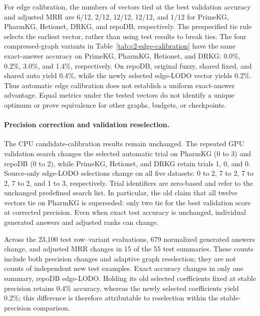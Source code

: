 \begin{table}[t]
\centering
\caption{Test adjusted MRR@20 in the graph-selection arm. Candidate order and
the compressed-graph budget are fixed per query. Invalid outputs retain the
explicit virtual-rank-one convention described in the protocol; these values
must not be read as generated-answer accuracy.}
\label{tab:c2-edge-calibration}

\end{table}

For edge calibration, the numbers of vectors tied at the best validation
accuracy and adjusted MRR are 6/12, 2/12, 12/12, 12/12, and 1/12 for PrimeKG,
PharmKG, Hetionet, DRKG, and repoDB, respectively. The prespecified tie rule
selects the earliest vector, rather than using test results to break ties.
The four compressed-graph variants in Table~\ref{tab:c2-edge-calibration} have
the same exact-answer accuracy on PrimeKG, PharmKG, Hetionet, and DRKG:
0.0\%, 0.2\%, 3.0\%, and 1.4\%, respectively. On repoDB, original fuzzy,
shared fixed, and shared auto yield 0.4\%, while the newly selected edge-LODO
vector yields 0.2\%. Thus automatic edge calibration does not establish a
uniform exact-answer advantage. Equal metrics
under the tested vectors do not identify a unique optimum or prove equivalence
for other graphs, budgets, or checkpoints.

\paragraph{Precision correction and validation reselection.}
The CPU candidate-calibration results remain unchanged. The repeated GPU
validation search changes the selected automatic trial on PharmKG (0 to 3) and
repoDB (0 to 2), while PrimeKG, Hetionet, and DRKG retain trials 1, 0, and 0.
Source-only edge-LODO selections change on all five datasets: 0 to 2, 7 to 2,
7 to 2, 7 to 2, and 1 to 3, respectively. Trial identifiers are zero-based and
refer to the unchanged predefined search list. In particular, the old claim
that all twelve vectors tie on PharmKG is superseded: only two tie for the best
validation score at corrected precision. Even when exact test accuracy is
unchanged, individual generated answers and adjusted ranks can change.

Across the 23,100 test row--variant evaluations, 679 normalized generated
answers change, and adjusted MRR changes in 15 of the 55 test summaries. These
counts include both precision changes and adaptive graph reselection; they are
not counts of independent new test examples. Exact accuracy changes in only
one summary, repoDB edge-LODO. Holding its old selected coefficients fixed at
stable precision retains 0.4\% accuracy, whereas the newly selected coefficients
yield 0.2\%; this difference is therefore attributable to reselection within
the stable-precision comparison.

